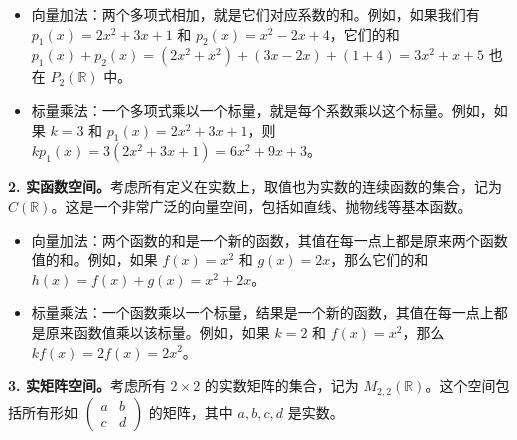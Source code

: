 \begin{itemize}
    \item 向量加法：两个多项式相加，就是它们对应系数的和。例如，如果我们有 \(p_1(x) = 2x^2 + 3x + 1\) 和 \(p_2(x) = x^2 - 2x + 4\)，它们的和 \(p_1(x) + p_2(x) = (2x^2 + x^2) + (3x - 2x) + (1 + 4) = 3x^2 + x + 5\) 也在 \(P_2(\mathbb{R})\) 中。
    \item 标量乘法：一个多项式乘以一个标量，就是每个系数乘以这个标量。例如，如果 \(k = 3\) 和 \(p_1(x) = 2x^2 + 3x + 1\)，则 \(kp_1(x) = 3(2x^2 + 3x + 1) = 6x^2 + 9x + 3\)。
\end{itemize}

\textbf{2. 实函数空间。}考虑所有定义在实数上，取值也为实数的连续函数的集合，记为 \(C(\mathbb{R})\)。这是一个非常广泛的向量空间，包括如直线、抛物线等基本函数。

\begin{itemize}
    \item 向量加法：两个函数的和是一个新的函数，其值在每一点上都是原来两个函数值的和。例如，如果 \(f(x) = x^2\) 和 \(g(x) = 2x\)，那么它们的和 \(h(x) = f(x) + g(x) = x^2 + 2x\)。
    \item 标量乘法：一个函数乘以一个标量，结果是一个新的函数，其值在每一点上都是原来函数值乘以该标量。例如，如果 \(k = 2\) 和 \(f(x) = x^2\)，那么 \(kf(x) = 2f(x) = 2x^2\)。
\end{itemize}

\textbf{3. 实矩阵空间。}考虑所有 \(2 \times 2\) 的实数矩阵的集合，记为 \(M_{2,2}(\mathbb{R})\)。这个空间包括所有形如 \(\begin{pmatrix} a & b \\ c & d \end{pmatrix}\) 的矩阵，其中 \(a, b, c, d\) 是实数。

